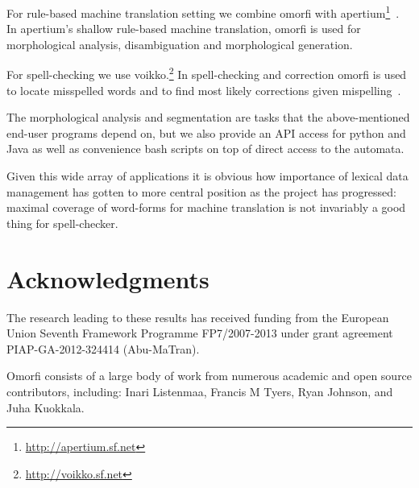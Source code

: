 \documentclass[11pt]{article}
\begin{document}
For rule-based machine translation setting we combine omorfi with
apertium\footnote{\url{http://apertium.sf.net}}~\cite{apertium}. In
apertium's shallow rule-based machine translation, omorfi is used for
morphological analysis, disambiguation and morphological generation.

For spell-checking we use voikko.\footnote{\url{http://voikko.sf.net}} In
spell-checking and correction omorfi is used to locate misspelled words
and to find most likely corrections given mispelling~\cite{pirinen2014state}.

The morphological analysis and segmentation are tasks that the above-mentioned
end-user programs depend on, but we also provide an API access for python and
Java as well as convenience bash scripts on top of direct access to the
automata.

Given this wide array of applications it is obvious how importance of lexical
data management has gotten to more central position as the project has
progressed: maximal coverage of word-forms for machine translation is not
invariably a good thing for spell-checker.

\section*{Acknowledgments}

The research leading to these results has received
funding from the European Union Seventh Framework
Programme FP7/2007-2013 under grant agreement
PIAP-GA-2012-324414 (Abu-MaTran).

Omorfi consists of a large body of work from numerous academic and open source contributors,
including: Inari Listenmaa, Francis M Tyers, Ryan
Johnson, and Juha Kuokkala.



\end{document}
